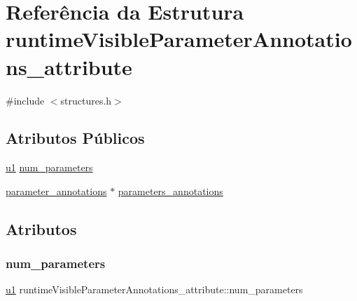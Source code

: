 \hypertarget{structruntimeVisibleParameterAnnotations__attribute}{}\section{Referência da Estrutura runtime\+Visible\+Parameter\+Annotations\+\_\+attribute}
\label{structruntimeVisibleParameterAnnotations__attribute}


{\ttfamily \#include $<$structures.\+h$>$}

\subsection*{Atributos Públicos}
\begin{DoxyCompactItemize}
\item 
\hyperlink{lista__operandos_8h_ad9f4cdb6757615aae2fad89dab3c5470}{u1} \hyperlink{structruntimeVisibleParameterAnnotations__attribute_ae31e0bdeb2761d98c425ff91c84a5eea}{num\+\_\+parameters}
\item 
\hyperlink{structparameter__annotations}{parameter\+\_\+annotations} $\ast$ \hyperlink{structruntimeVisibleParameterAnnotations__attribute_a42e5e477f793842b0caeba7b32088740}{parameters\+\_\+annotations}
\end{DoxyCompactItemize}


\subsection{Atributos}
\mbox{\label{structruntimeVisibleParameterAnnotations__attribute_ae31e0bdeb2761d98c425ff91c84a5eea}} 
\subsubsection{\texorpdfstring{num\+\_\+parameters}{num\_parameters}}
{\footnotesize\ttfamily \hyperlink{lista__operandos_8h_ad9f4cdb6757615aae2fad89dab3c5470}{u1} runtime\+Visible\+Parameter\+Annotations\+\_\+attribute\+::num\+\_\+parameters}


